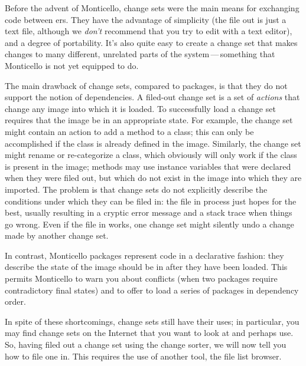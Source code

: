 \documentclass[a4paper,10pt,twoside]{book}
\begin{document}
Before the advent of Monticello, change sets were the main means for exchanging code between \sq{}ers.
They have the advantage of simplicity (the file out is just a text file, although we \emph{don't} recommend that you try to edit with a text editor), and a degree of portability.  
It's also quite easy to create a change set that makes changes to many different, unrelated parts of the system\,---\,something that Monticello is not yet equipped to do.

The main drawback of change sets, compared to  packages, is that they do not support the notion of dependencies.
A filed-out change set is a set of \emph{actions} that change any image into which it is loaded. To successfully load a change set requires that the image be in an appropriate state.
For example, the change set might contain an action to add a method to a class; this can only be accomplished if the class is already defined in the image.
Similarly, the change set might rename or re-categorize a class, which obviously will only work if the class is present in the image; methods may use instance variables that were declared when they were filed out, but which do not exist in the image into which they are imported.
The problem is that change sets do not explicitly describe the conditions under which they can be filed in:
the file in process just hopes for the best, usually resulting in a cryptic error message and a stack trace when things go wrong.
Even if the file in works, one change set might silently undo a change made by another change set.

In contrast, Monticello packages represent code in a declarative fashion: they describe the state of the image should be in after they have been loaded.
This permits Monticello to warn you about conflicts (when two packages require contradictory final states)
and to offer to load a series of packages in dependency order.

In spite of these shortcomings, change sets still have their uses; in particular, you may find change sets on the Internet that you want to look at and perhaps use.
So, having filed out a change set using the change sorter, we will now tell you how to file one in.
This requires the use of another tool, the file list browser.


\end{document}
